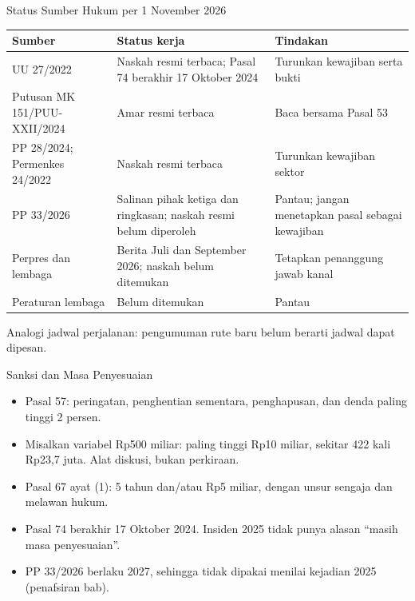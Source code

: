 \documentclass[aspectratio=169, table, 12pt]{beamer}
\begin{document}
\begin{frame}{{\Large Status Sumber Hukum per 1 November 2026}}
  \vspace{2pt}
  \scriptsize
  \begin{tabularx}{\textwidth}{|>{\raggedright\arraybackslash}p{}|>{\raggedright\arraybackslash}X|>{\raggedright\arraybackslash}X|}
    \hline
    \textbf{Sumber} & \textbf{Status kerja} & \textbf{Tindakan} \\ \hline
    UU 27/2022 & Naskah resmi terbaca; Pasal 74 berakhir 17 Oktober 2024 & Turunkan kewajiban serta
    bukti \\ \hline
    Putusan MK 151/PUU-XXII/2024 & Amar resmi terbaca & Baca bersama Pasal 53 \\ \hline
    PP 28/2024; Permenkes 24/2022 & Naskah resmi terbaca & Turunkan kewajiban sektor \\ \hline
    PP 33/2026 & Salinan pihak ketiga dan ringkasan; naskah resmi belum diperoleh & Pantau; jangan
    menetapkan pasal sebagai kewajiban \\ \hline
    Perpres dan lembaga & Berita Juli dan September 2026; naskah belum ditemukan & Tetapkan
    penanggung jawab kanal \\ \hline
    Peraturan lembaga & Belum ditemukan & Pantau \\ \hline
  \end{tabularx}

  \vspace{6pt}
  \small Analogi jadwal perjalanan: pengumuman rute baru belum berarti jadwal dapat dipesan.
\end{frame}

\begin{frame}{{\Large Sanksi dan Masa Penyesuaian}}
  \vspace{6pt}
  \small
  \begin{itemize}
    \item Pasal 57: peringatan, penghentian sementara, penghapusan, dan denda paling tinggi
          2 persen.
    \item Misalkan variabel Rp500 miliar: paling tinggi Rp10 miliar, sekitar 422 kali Rp23,7 juta.
          Alat diskusi, bukan perkiraan.
    \item Pasal 67 ayat (1): 5 tahun dan/atau Rp5 miliar, dengan unsur sengaja dan melawan hukum.
    \item Pasal 74 berakhir 17 Oktober 2024. Insiden 2025 tidak punya alasan ``masih masa
          penyesuaian''.
    \item PP 33/2026 berlaku 2027, sehingga tidak dipakai menilai kejadian 2025 (penafsiran bab).
  \end{itemize}
\end{frame}
\end{document}
